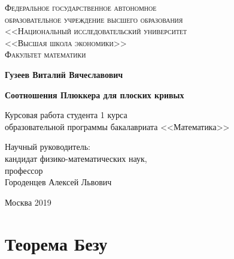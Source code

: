 \documentclass[a4paper, 12pt]{article}
\begin{document}
\begin{center}
{\scshape Федеральное государственное автономное\\
образовательное учреждение высшего образования\\
<<Национальный исследовательский университет\\
<<Высшая школа экономики>>\\[1ex]
Факультет математики\par}

\par\vfill

\textbf{\large Гузеев Виталий Вячеславович}

\vspace{1.5cm}

{\Large\bfseries
Соотношения Плюккера для плоских кривых
\par}

\vspace{1.5cm}

Курсовая работа студента 1 курса\\[1ex]
образовательной программы бакалавриата <<Математика>>
\par\vfill
\noindent\hspace{0.52\textwidth}\parbox[t]{0.48\textwidth}{%
Научный руководитель:\\[3pt]
кандидат физико-математических наук,\\
профессор\\
Городенцев Алексей Львович\\[2ex]
}%
\par\vfill
Москва 2019
\end{center}
\thispagestyle{empty}
\pagebreak
\section{Теорема Безу}
\end{document}

